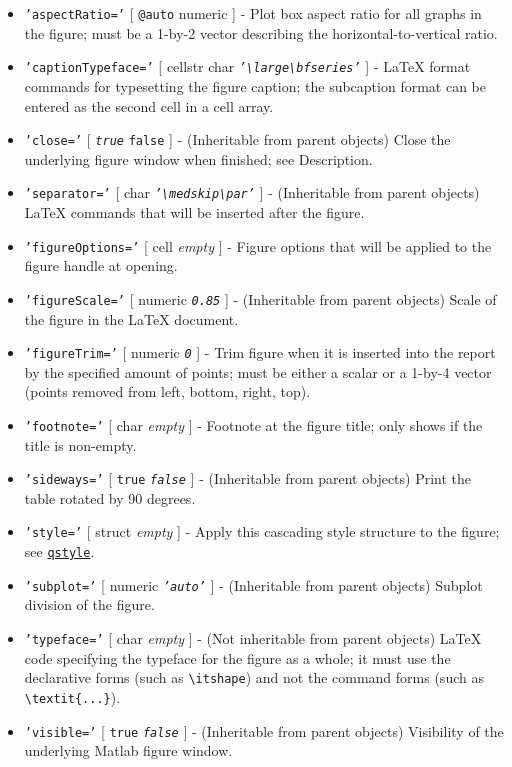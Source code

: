 \begin{itemize}
\item
  \texttt{'aspectRatio='} {[} \texttt{@auto} \textbar{} numeric {]} -
  Plot box aspect ratio for all graphs in the figure; must be a 1-by-2
  vector describing the horizontal-to-vertical ratio.
\item
  \texttt{'captionTypeface='} {[} cellstr \textbar{} char \textbar{}
  \emph{\texttt{'\textbackslash{}large\textbackslash{}bfseries'}} {]} -
  LaTeX format commands for typesetting the figure caption; the
  subcaption format can be entered as the second cell in a cell array.
\item
  \texttt{'close='} {[} \emph{\texttt{true}} \textbar{} \texttt{false}
  {]} - (Inheritable from parent objects) Close the underlying figure
  window when finished; see Description.
\item
  \texttt{'separator='} {[} char \textbar{}
  \emph{\texttt{'\textbackslash{}medskip\textbackslash{}par'}} {]} -
  (Inheritable from parent objects) LaTeX commands that will be inserted
  after the figure.
\item
  \texttt{'figureOptions='} {[} cell \textbar{} \emph{empty} {]} -
  Figure options that will be applied to the figure handle at opening.
\item
  \texttt{'figureScale='} {[} numeric \textbar{} \emph{\texttt{0.85}}
  {]} - (Inheritable from parent objects) Scale of the figure in the
  LaTeX document.
\item
  \texttt{'figureTrim='} {[} numeric \textbar{} \emph{\texttt{0}} {]} -
  Trim figure when it is inserted into the report by the specified
  amount of points; must be either a scalar or a 1-by-4 vector (points
  removed from left, bottom, right, top).
\item
  \texttt{'footnote='} {[} char \textbar{} \emph{empty} {]} - Footnote
  at the figure title; only shows if the title is non-empty.
\item
  \texttt{'sideways='} {[} \texttt{true} \textbar{}
  \emph{\texttt{false}} {]} - (Inheritable from parent objects) Print
  the table rotated by 90 degrees.
\item
  \texttt{'style='} {[} struct \textbar{} \emph{empty} {]} - Apply this
  cascading style structure to the figure; see
  \href{qreport/qstyle}{\texttt{qstyle}}.
\item
  \texttt{'subplot='} {[} numeric \textbar{} \emph{\texttt{'auto'}} {]}
  - (Inheritable from parent objects) Subplot division of the figure.
\item
  \texttt{'typeface='} {[} char \textbar{} \emph{empty} {]} - (Not
  inheritable from parent objects) LaTeX code specifying the typeface
  for the figure as a whole; it must use the declarative forms (such as
  \texttt{\textbackslash{}itshape}) and not the command forms (such as
  \texttt{\textbackslash{}textit\{...\}}).
\item
  \texttt{'visible='} {[} \texttt{true} \textbar{} \emph{\texttt{false}}
  {]} - (Inheritable from parent objects) Visibility of the underlying
  Matlab figure window.
\end{itemize}

